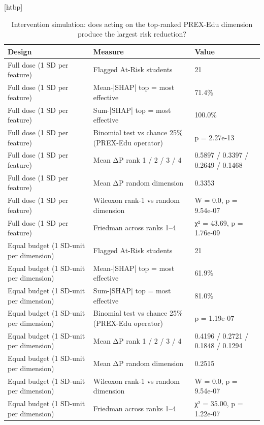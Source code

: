 \begin{table}
\small[htbp]
\caption{Intervention simulation: does acting on the top-ranked PREX-Edu dimension produce the largest risk reduction?}
\label{tab:S11_intervention_simulation}
\begin{tabular}{lll}
\toprule
Design & Measure & Value \\
\midrule
Full dose (1 SD per feature) & Flagged At-Risk students & 21 \\
Full dose (1 SD per feature) & Mean-|SHAP| top = most effective & 71.4\% \\
Full dose (1 SD per feature) & Sum-|SHAP| top = most effective & 100.0\% \\
Full dose (1 SD per feature) & Binomial test vs chance 25\% (PREX-Edu operator) & p = 2.27e-13 \\
Full dose (1 SD per feature) & Mean ΔP rank 1 / 2 / 3 / 4 & 0.5897 / 0.3397 / 0.2649 / 0.1468 \\
Full dose (1 SD per feature) & Mean ΔP random dimension & 0.3353 \\
Full dose (1 SD per feature) & Wilcoxon rank-1 vs random dimension & W = 0.0, p = 9.54e-07 \\
Full dose (1 SD per feature) & Friedman across ranks 1–4 & χ² = 43.69, p = 1.76e-09 \\
Equal budget (1 SD-unit per dimension) & Flagged At-Risk students & 21 \\
Equal budget (1 SD-unit per dimension) & Mean-|SHAP| top = most effective & 61.9\% \\
Equal budget (1 SD-unit per dimension) & Sum-|SHAP| top = most effective & 81.0\% \\
Equal budget (1 SD-unit per dimension) & Binomial test vs chance 25\% (PREX-Edu operator) & p = 1.19e-07 \\
Equal budget (1 SD-unit per dimension) & Mean ΔP rank 1 / 2 / 3 / 4 & 0.4196 / 0.2721 / 0.1848 / 0.1294 \\
Equal budget (1 SD-unit per dimension) & Mean ΔP random dimension & 0.2515 \\
Equal budget (1 SD-unit per dimension) & Wilcoxon rank-1 vs random dimension & W = 0.0, p = 9.54e-07 \\
Equal budget (1 SD-unit per dimension) & Friedman across ranks 1–4 & χ² = 35.00, p = 1.22e-07 \\
\bottomrule
\end{tabular}
\end{table}

